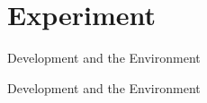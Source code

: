 \section{Experiment}

\begin{frame}{Development and the Environment}
  
\end{frame}

\begin{frame}{Development and the Environment}
  
\end{frame}
